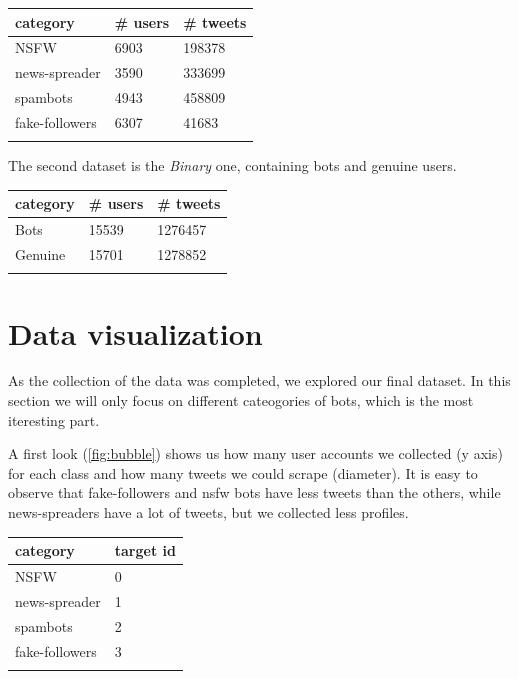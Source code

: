 \begin{center}
\begin{tabular}{lll}
	\\category&\# users&\# tweets\\
	\hline\hline
	NSFW&6903&198378\\
	news-spreader&3590&333699\\
	spambots&4943&458809\\
	fake-followers&6307&41683\\\hline\\	
\end{tabular}
\end{center}

The second dataset is the \textit{Binary} one, containing bots and genuine users.

\begin{center}
	\begin{tabular}{lll}
		\\category&\# users&\# tweets\\
		\hline\hline
		Bots&15539&1276457\\
		Genuine&15701&1278852\\\hline\\	
	\end{tabular}
\end{center}

\newpage
\section{Data visualization}
As the collection of the data was completed, we explored our final dataset. In this section we will only focus on different cateogories of bots, which is the most iteresting part.

A first look (\ref{fig:bubble}) shows us how many user accounts we collected (y axis) for each class and how many tweets we could scrape (diameter). It is easy to observe that fake-followers and nsfw bots have less tweets than the others, while news-spreaders have a lot of tweets, but we collected less profiles.
\begin{center}
	\begin{tabular}{ll}
		\\category&target id\\
		\hline\hline
		NSFW&0\\
		news-spreader&1\\
		spambots&2\\
		fake-followers&3\\\hline\\		
	\end{tabular}
\end{center}


